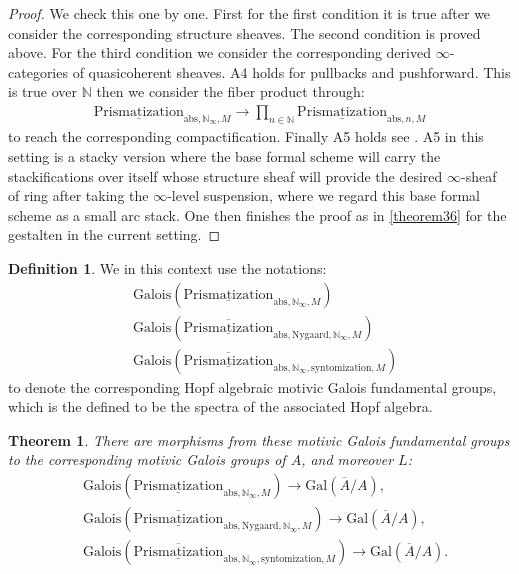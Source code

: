 \documentclass[12pt]{article}
\newtheorem{theorem}{Theorem}
\theoremstyle{definition}
\newtheorem{definition}{Definition}
\begin{document}
\begin{proof}
We check this one by one. First for the first condition it is true after we consider the corresponding structure sheaves. The second condition is proved above. For the third condition we consider the corresponding derived $\infty$-categories of quasicoherent sheaves. A4 holds for pullbacks and pushforward. This is true over $\mathbb{N}$ then we consider the fiber product through:
\begin{align}
{\underline{\mathrm{Prismatization}}}_{\mathrm{abs},\mathbb{N}_\infty,M}\rightarrow  \prod_{n\in \mathbb{N}} {\underline{\mathrm{Prismatization}}}_{\mathrm{abs},n,M}
\end{align}
to reach the corresponding compactification. Finally A5 holds see \cite[Chapter 4, in particular 4.7, 4.8, 4.9, 4.10]{3A}. A5 in this setting is a stacky version where the base formal scheme will carry the stackifications over itself whose structure sheaf will provide the desired $\infty$-sheaf of ring after taking the $\infty$-level suspension, where we regard this base formal scheme as a small arc stack. One then finishes the proof as in \cref{theorem36} for the gestalten in the current setting.
\end{proof}


\begin{definition}
We in this context use the notations:
\begin{align}
&\mathrm{Galois}(\underline{\mathrm{Prismatization}}_{\mathrm{abs},\mathbb{N}_\infty,M})\\
&\mathrm{Galois}(\overline{\underline{\mathrm{Prismatization}}}_{\mathrm{abs},\mathrm{Nygaard},\mathbb{N}_\infty,M})\\
&\mathrm{Galois}(\overline{\underline{\mathrm{Prismatization}}}_{\mathrm{abs},\mathbb{N}_\infty,\mathrm{syntomization},M})
\end{align}
to denote the corresponding Hopf algebraic motivic Galois fundamental groups, which is the defined to be the spectra of the associated Hopf algebra.
\end{definition}


\begin{theorem}
There are morphisms from these motivic Galois fundamental groups to the corresponding motivic Galois groups of $A$, and moreover $L$: 
\begin{align}
&\mathrm{Galois}(\underline{\mathrm{Prismatization}}_{\mathrm{abs},\mathbb{N}_\infty,M})\rightarrow \mathrm{Gal}(\overline{A}/A),\\
&\mathrm{Galois}(\overline{\underline{\mathrm{Prismatization}}}_{\mathrm{abs},\mathrm{Nygaard},\mathbb{N}_\infty,M})\rightarrow \mathrm{Gal}(\overline{A}/A),\\
&\mathrm{Galois}(\overline{\underline{\mathrm{Prismatization}}}_{\mathrm{abs},\mathbb{N}_\infty,\mathrm{syntomization},M})\rightarrow \mathrm{Gal}(\overline{A}/A).
\end{align}
\end{theorem}
\end{document}
